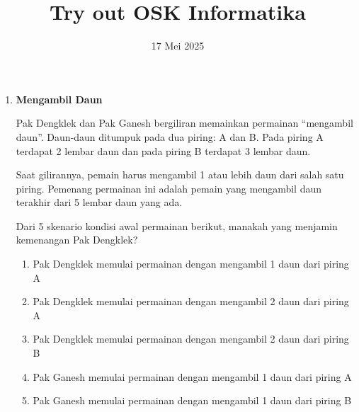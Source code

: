 \documentclass[a4paper,11pt]{article}
\title{Try out OSK Informatika}
\author{17 Mei 2025}
\date{}
\begin{document}
\maketitle
\begin{enumerate}
  \item \textbf{Mengambil Daun}
  
  Pak Dengklek dan Pak Ganesh bergiliran memainkan permainan ``mengambil daun''. Daun-daun ditumpuk pada dua piring: A dan B. Pada piring A terdapat 2 lembar daun dan pada piring B terdapat 3 lembar daun.

\begin{center}
\end{center}

\vspace{0.5em}

Saat gilirannya, pemain harus mengambil 1 atau lebih daun dari salah satu piring. Pemenang permainan ini adalah pemain yang mengambil daun terakhir dari 5 lembar daun yang ada.

\vspace{1em}

Dari 5 skenario kondisi awal permainan berikut, manakah yang menjamin kemenangan Pak Dengklek?

\begin{enumerate}[label=\Alph*.]
  \item Pak Dengklek memulai permainan dengan mengambil 1 daun dari piring A
  \item Pak Dengklek memulai permainan dengan mengambil 2 daun dari piring A
  \item Pak Dengklek memulai permainan dengan mengambil 2 daun dari piring B
  \item Pak Ganesh memulai permainan dengan mengambil 1 daun dari piring A
  \item Pak Ganesh memulai permainan dengan mengambil 1 daun dari piring B
\end{enumerate}


\end{enumerate}
\end{document}
